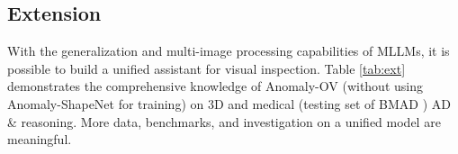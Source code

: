 





\subsection{Extension}
With the generalization and multi-image processing capabilities of MLLMs, it is possible to build a unified assistant for visual inspection. Table \ref{tab:ext} demonstrates the comprehensive knowledge of Anomaly-OV (without using Anomaly-ShapeNet \cite{anomaly_shapenet} for training) on 3D and medical (testing set of BMAD \cite{bmad}) AD \& reasoning. More data, benchmarks, and investigation on a unified model are meaningful.

